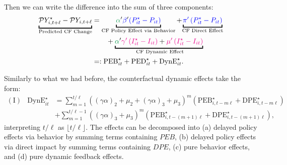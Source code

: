 \documentclass[11pt,reqno,letter]{amsart}
\theoremstyle{definition}
\def\bcolor{\color{ForestGreen}}
\def\pcolor{\color{blue}}
\def\icolor{\color{magenta}}
\begin{document}
Then we can write  the difference into the sum of three components:
  \begin{align}
\underbracket{\mathcal{P} Y^\star_{i,t+\ell} - \mathcal{P} Y_{i,t+\ell} }_{\text{Predicted CF Change}} & =
\underbracket{{\bcolor\alpha}' {\pcolor\beta}' {\pcolor\left(P^\star_{it} - P_{it} \right)}}_{\text{CF Policy Effect via Behavior}}  +    {\underbracket{\pcolor\pi' \left( P^\star_{it} -  P_{it} \right)}_{\text{CF Direct  Effect}} } \nonumber\\
&\qquad +  {\underbracket{{\bcolor\alpha}' {\icolor{\gamma}'  \left( I^\star_{it} - I_{it} \right)}+ {\icolor{\mu}'  \left( I^\star_{it} -  I_{it} \right)}}_{\text{ CF Dynamic Effect}}} \nonumber \\
 & =:   \mathrm{PEB}^\star_{it} + \mathrm{PED}^\star_{it} + \mathrm{DynE}^\star_{it}. \label{eqn:DC2}
  \end{align}

Similarly to what we had before,  the counterfactual dynamic effects take the form:
$$
\begin{array}{lll}
(\mathrm{I})  & \mathrm{DynE}^\star_{it} &=
  \sum_{m=1}^{t/\ell} \left( (\gamma \alpha)_2 + \mu_2+  (\gamma \alpha)_3+ \mu_3    \right)^m \left(\mathrm{PEB}^\star_{i,t-m \ell } +  \mathrm{DPE}^\star_{i,t- m\ell} \right)
  \\
 &&  + \sum_{m=1}^{t/\ell-1} \left( (\gamma \alpha)_3 + \mu_3    \right)^m \left (\mathrm{PEB}^\star_{i,t-(m +1) \ell } +  \mathrm{DPE}^\star_{i,t- (m+1)\ell}  \right),
 \end{array}
 $$
 interpreting $t/\ell$ as $\lfloor t/\ell \rfloor$.
 The effects can be decomposed into (a) delayed policy effects via behavior by
summing terms containing $PEB$, (b) delayed policy effects via direct impact
by summing terms containing $DPE$,  (c) pure behavior effects, and (d)  pure dynamic feedback effects.
\end{document}
